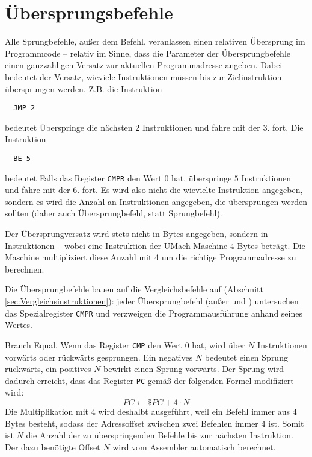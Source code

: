 \section{Übersprungsbefehle}
\label{sec:Sprungbefehle}

Alle Sprungbefehle, außer dem  Befehl, veranlassen einen relativen
Übersprung im Programmcode -- relativ im Sinne, dass die Parameter der
Übersprungbefehle einen ganzzahligen Versatz zur aktuellen Programmadresse
angeben. Dabei bedeutet der Versatz, wieviele Instruktionen
müssen bis zur Zielinstruktion übersprungen werden. Z.B. die Instruktion
\begin{lstlisting}
  JMP 2
\end{lstlisting}
bedeutet
\glqq Überspringe die nächsten 2 Instruktionen und fahre mit der 3. fort\grqq.
Die Instruktion
\begin{lstlisting}
  BE 5
\end{lstlisting}
bedeutet \glqq Falls das Register \texttt{CMPR} den Wert $0$ hat, überspringe
$5$ Instruktionen und fahre mit der 6. fort\grqq. Es wird also nicht die
wievielte Instruktion angegeben, sondern es wird die Anzahl an Instruktionen
angegeben, die übersprungen werden sollten (daher auch \glqq
Übersprungbefehl\grqq, statt \glqq Sprungbefehl\grqq).

Der Übersprungversatz wird stets nicht in Bytes angegeben, sondern in
Instruktionen -- wobei eine Instruktion der UMach Maschine 4 Bytes beträgt. Die
Maschine multipliziert diese Anzahl mit 4 um die richtige Programmadresse zu
berechnen.

Die Übersprungbefehle bauen auf die Vergleichsbefehle auf (Abschnitt
\ref{sec:Vergleichsinstruktionen}): jeder Übersprungbefehl (außer 
und ) untersuchen das Spezialregister \texttt{CMPR} und verzweigen die
Programmausführung anhand seines Wertes.



\glqq Branch Equal\grqq.
Wenn das Register \texttt{CMP} den Wert $0$ hat, wird über $N$ Instruktionen
vorwärts oder rückwärts gesprungen. Ein negatives $N$ bedeutet einen Sprung
rückwärts, ein positives $N$ bewirkt einen Sprung vorwärts. Der Sprung wird
dadurch erreicht, dass das Register \texttt{PC} gemäß der folgenden Formel
modifiziert wird:
\[
    PC \gets \$PC + 4 \cdot N
\]
Die Multiplikation mit $4$ wird deshalbt ausgeführt, weil ein Befehl immer aus 4
Bytes besteht, sodass der Adressoffset zwischen zwei Befehlen immer 4 ist. Somit
ist $N$ die Anzahl der zu überspringenden Befehle bis zur nächsten Instruktion.
Der dazu benötigte Offset $N$ wird vom Assembler automatisch berechnet. 

